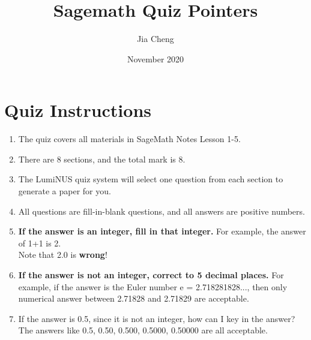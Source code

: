 \documentclass{article}
\title{Sagemath Quiz Pointers}
\author{Jia Cheng}
\date{November 2020}
\begin{document}
\maketitle

\section*{Quiz Instructions}
\begin{enumerate}
	\item The quiz covers all materials in SageMath Notes Lesson 1-5.
	\item There are 8 sections, and the total mark is 8.
	\item The LumiNUS quiz system will select one question from each section to generate a paper for you.
	\item All questions are fill-in-blank questions, and all answers are positive numbers.
	\item \textbf{If the answer is an integer, fill in that integer.}  For example, the answer of 1+1 is 2.\\
	Note that 2.0 is \textbf{wrong}!
	\item \textbf{If the answer is not an integer, correct to 5 decimal places.}  For example, if the answer is the Euler number e = 2.718281828..., then only numerical answer between 2.71828 and 2.71829 are acceptable.
	\item If the answer is 0.5, since it is not an integer, how can I key in the answer?
The answers like 0.5, 0.50, 0.500, 0.5000, 0.50000 are all acceptable.
\end{enumerate}
\end{document}
